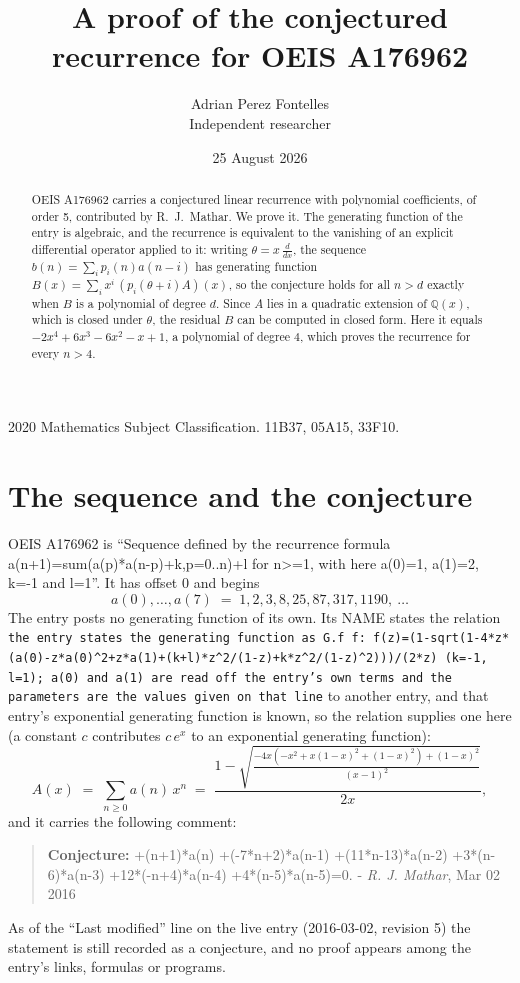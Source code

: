 \documentclass[11pt,a4paper]{article}
\title{A proof of the conjectured recurrence for OEIS A176962}
\author{Adrian Perez Fontelles\\ \small Independent researcher}
\date{25 August 2026}
\theoremstyle{plain}
\theoremstyle{definition}
\begin{document}
\maketitle

\begin{abstract}
OEIS A176962 carries a conjectured linear recurrence with polynomial coefficients, of
order 5, contributed by R.~J.~Mathar. We prove it. The generating function of the
entry is algebraic, and the recurrence is equivalent to the vanishing of an explicit
differential operator applied to it: writing $\theta=x\,\frac{d}{dx}$, the sequence
$b(n)=\sum_{i}p_{i}(n)a(n-i)$ has generating function
$B(x)=\sum_{i}x^{i}\,(p_{i}(\theta+i)A)(x)$, so the conjecture holds for all $n>d$ exactly
when $B$ is a polynomial of degree $d$. Since $A$ lies in a quadratic extension of
$\mathbb{Q}(x)$, which is closed under $\theta$, the residual $B$ can be computed in
closed form. Here it equals $- 2 x^{4} + 6 x^{3} - 6 x^{2} - x + 1$, a polynomial of degree $4$, which proves
the recurrence for every $n>4$.
\end{abstract}

\noindent\small 2020 Mathematics Subject Classification. 11B37, 05A15, 33F10.\normalsize

\section{The sequence and the conjecture}

OEIS A176962 is ``Sequence defined by the recurrence formula a(n+1)=sum(a(p)*a(n-p)+k,p=0..n)+l for n>=1, with here a(0)=1, a(1)=2, k=-1 and l=1''. It has offset $0$ and begins
\[
a(0),\dots,a(7)\;=\;1, 2, 3, 8, 25, 87, 317, 1190,\ \dots
\]
The entry posts no generating function of its own. Its NAME states the
relation \texttt{the entry states the generating function as G.f f: f(z)=(1-sqrt(1-4*z*(a(0)-z*a(0)\textasciicircum{}2+z*a(1)+(k+l)*z\textasciicircum{}2/(1-z)+k*z\textasciicircum{}2/(1-z)\textasciicircum{}2)))/(2*z) (k=-1, l=1); a(0) and a(1) are read off the entry's own terms and the parameters are the values given on that line} to another entry, and that entry's exponential generating
function is known, so the relation supplies one here (a constant $c$ contributes
$c\,e^{x}$ to an exponential generating function):
\begin{equation}\label{eq:gf}
A(x)\;=\;\sum_{n\ge 0} a(n)\,x^{n}\;=\;\frac{1 - \sqrt{\frac{- 4 x \left(- x^{2} + x \left(1 - x\right)^{2} + \left(1 - x\right)^{2}\right) + \left(1 - x\right)^{2}}{\left(x - 1\right)^{2}}}}{2 x} ,
\end{equation}
and it carries the following comment:
\begin{quote}\small
\textbf{Conjecture:} +(n+1)*a(n) +(-7*n+2)*a(n-1) +(11*n-13)*a(n-2) +3*(n-6)*a(n-3) +12*(-n+4)*a(n-4) +4*(n-5)*a(n-5)=0. - \emph{R. J. Mathar}, Mar 02 2016
\end{quote}
As of the ``Last modified'' line on the live entry (2016-03-02, revision 5) the
statement is still recorded as a conjecture, and no proof appears among the entry's links,
formulas or programs.
\end{document}

